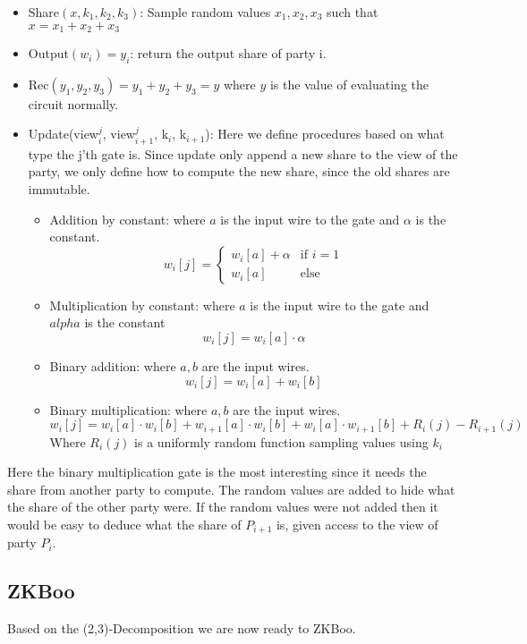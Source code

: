 \begin{itemize}
  \item Share$(x, k_{1}, k_{2}, k_{3})$: Sample random values
    $x_{1}, x_{2}, x_{3}$ such that $x = x_{1} + x_{2} + x_{3}$
  \item Output$(w_{i}) = y_{i}$: return the output share of party i.
  \item Rec$(y_{1}, y_{2}, y_{3}) = y_{1} + y_{2} + y_{3} = y$ where $y$ is the
    value of evaluating the circuit normally.
  \item Update(view$^{j}_{i}$, view$^{j}_{i+1}$, k$_{i}$, k$_{i+1}$): Here we
    define procedures based on what type the j'th gate is. Since update only
    append a new share to the view of the party, we only define how to compute
    the new share, since the old shares are immutable.
    \begin{itemize}
      \item Addition by constant: where $a$ is the input wire to the gate
        and $\alpha$ is the constant.
        $$ w_{i}[j] =
        \begin{cases} w_{i}[a] + \alpha & \text{if } i = 1 \\
                      w_{i}[a]          & \text{else}       %
        \end{cases}$$
      \item Multiplication by constant: where $a$ is the input wire to the gate
        and $alpha$ is the constant
        $$ w_{i}[j] = w_{i}[a] \cdot \alpha$$
      \item Binary addition: where $a, b$ are the input wires.
        $$
        w_{i}[j] = w_{i}[a] + w_{i}[b]
        $$
      \item Binary multiplication: where $a, b$ are the input wires.
        $$
        w_{i}[j] = w_{i}[a] \cdot w_{i}[b] + w_{i+1}[a] \cdot w_{i}[b] + w_{i}[a] \cdot w_{i+1}[b] + R_{i}(j) - R_{i+1}(j)
        $$
        Where $R_{i}(j)$ is a uniformly random function sampling values using $k_{i}$
    \end{itemize}
\end{itemize}

Here the binary multiplication gate is the most interesting since it needs the
share from another party to compute. The random values are added to hide what
the share of the other party were. If the random values were not added then it
would be easy to deduce what the share of $P_{i+1}$ is, given access to the
view of party $P_{i}$.

\subsection{ZKBoo}
\label{subsec:general:zkboo}
Based on the (2,3)-Decomposition we are now ready to ZKBoo.

